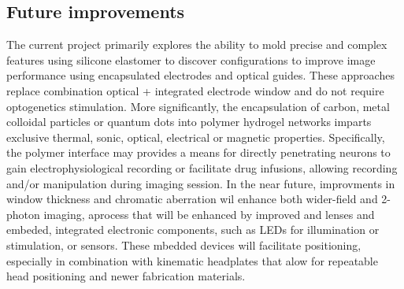 \documentclass[../main.tex]{subfiles}
\begin{document}
\subsection{Future improvements}\label{sec:future-improvements}
The current project primarily explores the ability to mold precise and complex features using silicone elastomer to discover configurations to improve image performance using encapsulated electrodes and optical guides.
These approaches replace combination optical + integrated electrode window and do not require optogenetics stimulation.
More significantly, the encapsulation of carbon, metal colloidal particles or quantum dots into polymer hydrogel networks imparts exclusive thermal, sonic, optical, electrical or magnetic properties.
Specifically, the polymer interface may provides a means for directly penetrating neurons to gain electrophysiological recording or facilitate drug infusions, allowing recording and/or manipulation during imaging session.
In the near future, improvments in window thickness and chromatic aberration wil enhance both wider-field and 2-photon imaging, aprocess that will be enhanced by improved and lenses and embeded, integrated electronic components, such as LEDs for illumination or stimulation, or sensors.
These mbedded devices will facilitate positioning, especially in combination with kinematic headplates that alow for repeatable head positioning and newer fabrication materials.

\clearpage
\end{document}
